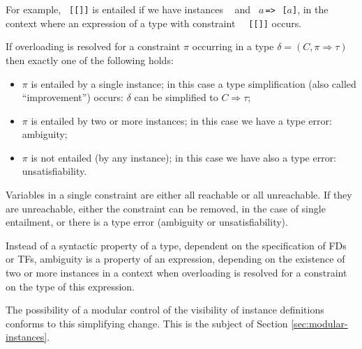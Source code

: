 For example, {\tt \Eq\ [[\Integer]]} is entailed if we have instances
{\tt \Eq\ \Integer} and {\tt \Eq\ $a\,$=>$\,$\Eq\ [$a$]}, in the
context where an expression of a type with constraint {\tt
  \Eq\ [[\Integer]]} occurs.

If overloading is resolved for a constraint $\pi$ occurring in a type
$\delta = (C,\pi \Rightarrow \tau)$ then exactly one of the following
holds:
\begin{itemize}

\item $\pi$ is entailed by a single instance; in this case a type
  simplification (also called ``improvement'') occurs: $\delta$ can be
  simplified to $C \Rightarrow \tau$;

\item $\pi$ is entailed by two or more instances; in this case we have
  a type error: ambiguity;

\item $\pi$ is not entailed (by any instance); in this case we have also
  a type error: unsatisfiability.

\end{itemize}

Variables in a single constraint are either all reachable or all
unreachable. If they are unreachable, either the constraint can be
removed, in the case of single entailment, or there is a type error
(ambiguity or unsatisfiability).

Instead of a syntactic property of a type, dependent on the
specification of FDs or TFs, ambiguity is a property of an expression,
depending on the existence of two or more instances in a context when
overloading is resolved for a constraint on the type of this
expression.

The possibility of a modular control of the visibility of instance
definitions conforms to this simplifying change. This is the subject
of Section \ref{sec:modular-instances}. 
